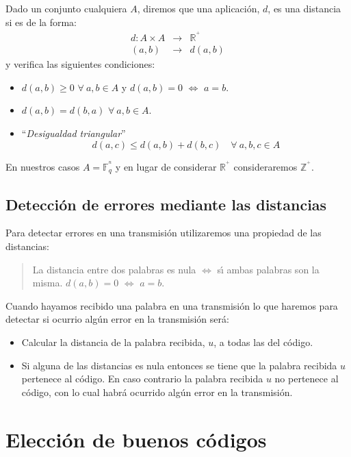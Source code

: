 Dado un conjunto cualquiera $A$, diremos que una aplicaci\'on, $d$, es una
distancia si es de la forma:
\begin{eqnarray*}
d: A\times A&\longrightarrow& \mathbb{R}^{^+}\\
(a,b)&\longrightarrow& d(a,b)
\end{eqnarray*}
y verifica las siguientes condiciones:
\begin{itemize}
\item $d(a,b)\geq 0$ $\forall \ a,b \in A$ y $d(a,b)=0$ $\Longleftrightarrow$
$a=b$.
\item $d(a,b)=d(b,a)$ $\forall \ a,b\in A$.
\item ``\emph{Desigualdad triangular}''
\begin{displaymath}
d(a,c)\leq d(a,b) + d(b,c)\quad \forall \ a,b,c\in A
\end{displaymath}
\end{itemize}
En nuestros casos $A=\mathbb{F}^{^n}_q$ y en lugar de considerar
$\mathbb{R}^{^+}$ consideraremos $\mathbb{Z}^{^+}$.

\subsection{Detecci\'on de errores mediante las distancias}\label{sec:DistanErr}

Para detectar errores en una transmisi\'on utilizaremos una propiedad de las
distancias:
\begin{quote}
La distancia entre dos palabras es nula $\Longleftrightarrow$ s\'{\i} ambas
palabras son la misma. $d(a,b)=0$ $\Longleftrightarrow$ $a=b$.
\end{quote}
Cuando hayamos recibido una palabra en una transmisi\'on lo que haremos para
detectar si ocurrio alg\'un error en la transmisi\'on ser\'a:
\begin{itemize}
\item Calcular la distancia de la palabra recibida, $u$, a todas las del
c\'odigo.
\item Si alguna de las distancias es nula entonces se tiene que la palabra
recibida $u$ pertenece al c\'odigo. En caso contrario la palabra recibida $u$
no pertenece al c\'odigo, con lo cual habr\'a ocurrido alg\'un error en la
transmisi\'on.
\end{itemize}
%
%

\section{Elecci\'on de buenos c\'odigos}

